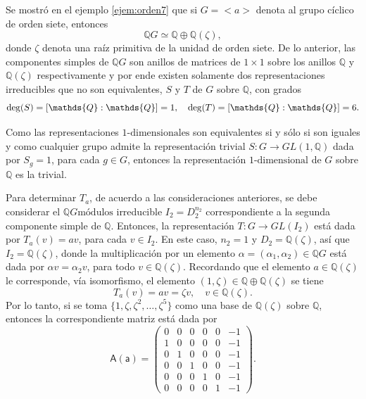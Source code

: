 \begin{ejemplo}
 Se mostró  en el ejemplo \ref{ejem:orden7} que si $G = <a>$ denota al grupo cíclico de orden siete, entonces
 \begin{equation*} \mathds{Q}G \simeq \mathds{Q}\oplus\mathds{Q}(\zeta), \end{equation*} donde $\zeta$ denota una raíz primitiva de la unidad de orden siete. De lo anterior, las componentes simples de $\mathds{Q}G$ son anillos de matrices de $1\times 1$ sobre los anillos $\mathds{Q}$ y $\mathds{Q}(\zeta)$ respectivamente y por ende existen solamente dos representaciones irreducibles que no son equivalentes, $S$ y $T$ de $G$ sobre $\mathds{Q}$, con grados
 \begin{equation*} \grado(S) = [\mathds{Q}:\mathds{Q}] = 1, \quad \grado(T) = [\mathds{Q}:\mathds{Q}] = 6. \end{equation*} 
 
 Como las representaciones $1\mbox{-dimensionales}$ son equivalentes si y sólo si son iguales y como cualquier grupo admite la representación trivial $S \colon G \to GL(1,\mathds{Q})$ dada por $S_g = 1$, para cada $g \in G$, entonces la representación $1\mbox{-dimensional}$ de $G$ sobre $\mathds{Q}$ es la trivial.
 
 Para determinar $T_a$, de acuerdo a las consideraciones anteriores, se debe considerar el $\mathds{Q}G\mbox{módulos}$ irreducible $I_2 = D_2^{n_2}$ correspondiente a la segunda componente simple de $\mathds{Q}$. Entonces, la representación $T \colon G \to GL(I_2)$ está dada por $T_a(v) = av$, para cada $v \in I_2$. En este caso, $n_2 = 1$ y $D_2 = \mathds{Q}(\zeta)$, así que $I_2 = \mathds{Q}(\zeta)$, donde la multiplicación por un elemento $\alpha = (\alpha_1, \alpha_2) \in \mathds{Q}G$ está dada por $\alpha v = \alpha_2v$, para todo $v \in \mathds{Q}(\zeta)$. Recordando que el elemento $a \in \mathds{Q}(\zeta)$ le corresponde, vía isomorfismo, el elemento $(1,\zeta) \in \mathds{Q}\oplus\mathds{Q}(\zeta)$ se tiene
 \begin{equation*} T_a(v) = av = \zeta v, \quad v 
 \in \mathds{Q}(\zeta). \end{equation*} Por lo tanto, si se toma $\{ 1, \zeta, \zeta^2, \dots, \zeta^5 \}$ como una base de $\mathds{Q}(\zeta)$ sobre $\mathds{Q}$, entonces la correspondiente matriz está dada por
 \begin{equation*} \mathsf{A(a)} = \begin{pmatrix}
 0 & 0 & 0 & 0 & 0 & -1 \\
 1 & 0 & 0 & 0 & 0 & -1 \\
 0 & 1 & 0 & 0 & 0 & -1 \\
 0 & 0 & 1 & 0 & 0 & -1 \\
 0 & 0 & 0 & 1 & 0 & -1 \\
 0 & 0 & 0 & 0 & 1 & -1
 \end{pmatrix}. \end{equation*}
 \end{ejemplo}

